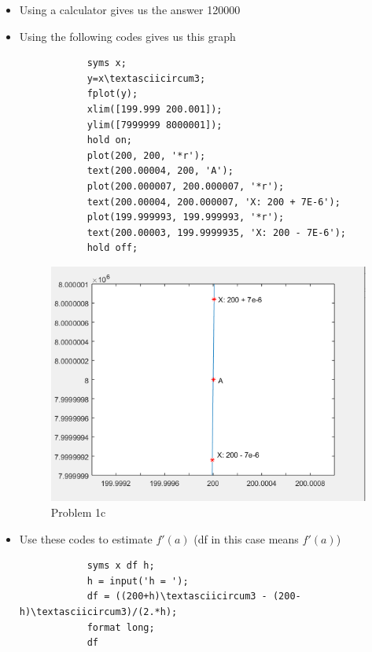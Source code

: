\documentclass[12pt,en,a4paper]{article}
\begin{document}
	\begin{itemize}
		\item Using a calculator gives us the answer 120000
		\item Using the following codes gives us this graph\\
		\begin{mdframed}[hidealllines=true,backgroundcolor=magenta!10]
			\begin{lstlisting}
			syms x;
			y=x\textasciicircum3;
			fplot(y);
			xlim([199.999 200.001]);
			ylim([7999999 8000001]);
			hold on;
			plot(200, 200, '*r');
			text(200.00004, 200, 'A');
			plot(200.000007, 200.000007, '*r');
			text(200.00004, 200.000007, 'X: 200 + 7E-6');
			plot(199.999993, 199.999993, '*r');
			text(200.00003, 199.9999935, 'X: 200 - 7E-6');
			hold off;
			\end{lstlisting}
		\end{mdframed}
		\begin{figure}[h]
			\centering
			\includegraphics[scale=0.5]{1c.png}
			\caption*{Problem 1c}
			\label{prob1c}
		\end{figure}
		\item Use these codes to estimate \(f'(a)\) (df in this case means \(f'(a)\))\\
		\begin{mdframed}[hidealllines=true,backgroundcolor=magenta!10]
			\begin{lstlisting}
			syms x df h;
			h = input('h = ');
			df = ((200+h)\textasciicircum3 - (200-h)\textasciicircum3)/(2.*h);
			format long;
			df
			\end{lstlisting}
		\end{mdframed}

\end{itemize}
\end{document}

